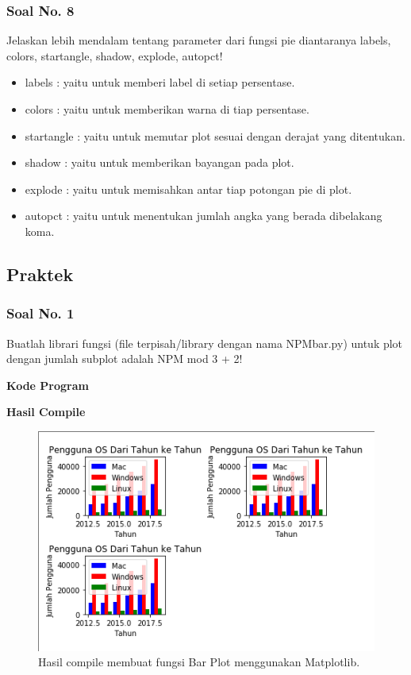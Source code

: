 \subsubsection{Soal No. 8}
\hfill \break
 Jelaskan lebih mendalam tentang parameter dari fungsi pie diantaranya labels, colors, startangle, shadow, explode, autopct!
 
 \begin{itemize}
 	\item labels : yaitu untuk memberi label di setiap persentase.
 	\item colors : yaitu untuk memberikan warna di tiap persentase.
 	\item startangle : yaitu untuk memutar plot sesuai dengan derajat yang ditentukan.
 	\item shadow : yaitu untuk memberikan bayangan pada plot.
 	\item explode : yaitu untuk memisahkan antar tiap potongan pie di plot.
 	\item autopct : yaitu untuk menentukan jumlah angka yang berada dibelakang koma.
 \end{itemize}

\subsection{Praktek}
\subsubsection{Soal No. 1}
\hfill \break
Buatlah librari fungsi (file terpisah/library dengan nama NPMbar.py) untuk plot dengan jumlah subplot adalah NPM mod 3 + 2!

\hfill \break
\textbf{Kode Program}



\hfill \break
\textbf{Hasil Compile}

\begin{figure}[H]
	\includegraphics[width=12cm]{figures/6/1174017/p1.png}
	\centering
	\caption{Hasil compile membuat fungsi Bar Plot menggunakan Matplotlib.}
\end{figure}

